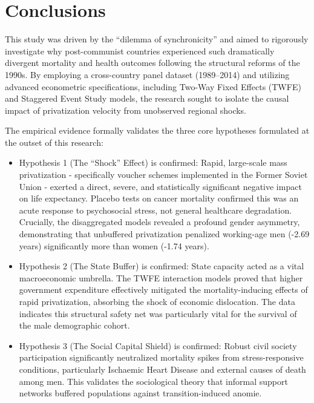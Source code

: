\documentclass[en,magisterska]{pracamgr}
\begin{document}
\section*{Conclusions}
This study was driven by the ``dilemma of synchronicity'' and aimed to rigorously investigate why post-communist countries experienced such dramatically divergent mortality and health outcomes 
following the structural reforms of the 1990s. By employing a cross-country panel dataset (1989--2014) and utilizing advanced econometric specifications, including Two-Way Fixed Effects (TWFE) and 
Staggered Event Study models, the research sought to isolate the causal impact of privatization velocity from unobserved regional shocks.

The empirical evidence formally validates the three core hypotheses formulated at the outset of this research:
\begin{itemize}
    \item Hypothesis 1 (The ``Shock'' Effect) is confirmed: Rapid, large-scale mass privatization  -  specifically voucher schemes implemented in the Former Soviet Union  -  exerted a direct, 
    severe, and statistically significant negative impact on life expectancy. Placebo tests on cancer mortality confirmed this was an acute response to psychosocial stress, not general healthcare 
    degradation. Crucially, the disaggregated models revealed a profound gender asymmetry, demonstrating that unbuffered privatization penalized working-age men (-2.69 years) significantly more than 
    women (-1.74 years).
    \item Hypothesis 2 (The State Buffer) is confirmed: State capacity acted as a vital macroeconomic umbrella. The TWFE interaction models proved that higher government expenditure effectively 
    mitigated the mortality-inducing effects of rapid privatization, absorbing the shock of economic dislocation. The data indicates this structural safety net was particularly vital for the survival of 
    the male demographic cohort.
    \item Hypothesis 3 (The Social Capital Shield) is confirmed: Robust civil society participation significantly neutralized mortality spikes from stress-responsive conditions, particularly 
    Ischaemic Heart Disease and external causes of death among men. This validates the sociological theory that informal support networks buffered populations against transition-induced anomie.
\end{itemize}
\end{document}
